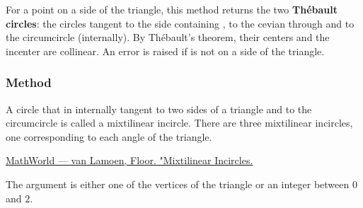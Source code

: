 For a point  on a side of the triangle, this method returns the two
\textbf{Thébault circles}: the circles tangent to the side containing ,
to the cevian through  and to the circumcircle (internally). By
Thébault's theorem, their centers and the incenter are collinear.
An error is raised if  is not on a side of the triangle.

\begin{tkzexample}[latex=.5\textwidth]
\begin{center}
\end{center}
\end{tkzexample}

\subsubsection{Method }
\label{ssub:method_triangle_mixti}

A circle that in internally tangent to two sides of a triangle and to the circumcircle is called a mixtilinear incircle. There are three mixtilinear incircles, one corresponding to each angle of the triangle.
\begin{flushright}
\small
\href{https://mathworld.wolfram.com/MixtilinearIncircles.html}{MathWorld — van Lamoen, Floor. "Mixtilinear Incircles.}
\end{flushright}

The argument is either one of the vertices of the triangle or an integer between $0$
 and $2$.

\begin{tkzexample}[latex=.52\textwidth]
\end{tkzexample}

